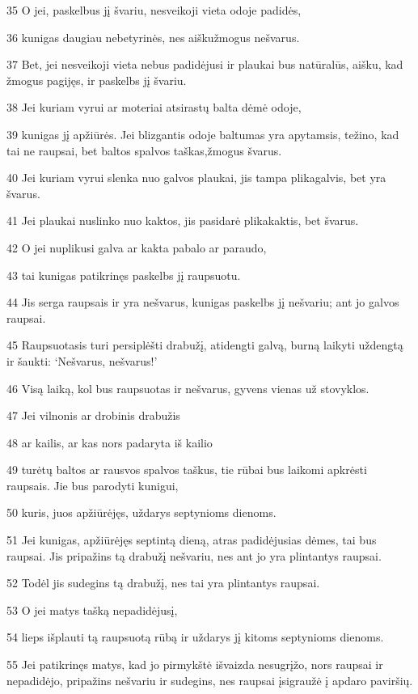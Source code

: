 \par 35 O jei, paskelbus jį švariu, nesveikoji vieta odoje padidės, 
\par 36 kunigas daugiau nebetyrinės, nes aišku­žmogus nešvarus. 
\par 37 Bet, jei nesveikoji vieta nebus padidėjusi ir plaukai bus natūralūs, aišku, kad žmogus pagijęs, ir paskelbs jį švariu. 
\par 38 Jei kuriam vyrui ar moteriai atsirastų balta dėmė odoje, 
\par 39 kunigas jį apžiūrės. Jei blizgantis odoje baltumas yra apytamsis, težino, kad tai ne raupsai, bet baltos spalvos taškas,­žmogus švarus. 
\par 40 Jei kuriam vyrui slenka nuo galvos plaukai, jis tampa plikagalvis, bet yra švarus. 
\par 41 Jei plaukai nuslinko nuo kaktos, jis pasidarė plikakaktis, bet švarus. 
\par 42 O jei nuplikusi galva ar kakta pabalo ar paraudo, 
\par 43 tai kunigas patikrinęs paskelbs jį raupsuotu. 
\par 44 Jis serga raupsais ir yra nešvarus, kunigas paskelbs jį nešvariu; ant jo galvos raupsai. 
\par 45 Raupsuotasis turi persiplėšti drabužį, atidengti galvą, burną laikyti uždengtą ir šaukti: ‘Nešvarus, nešvarus!’ 
\par 46 Visą laiką, kol bus raupsuotas ir nešvarus, gyvens vienas už stovyklos. 
\par 47 Jei vilnonis ar drobinis drabužis 
\par 48 ar kailis, ar kas nors padaryta iš kailio 
\par 49 turėtų baltos ar rausvos spalvos taškus, tie rūbai bus laikomi apkrėsti raupsais. Jie bus parodyti kunigui, 
\par 50 kuris, juos apžiūrėjęs, uždarys septynioms dienoms. 
\par 51 Jei kunigas, apžiūrėjęs septintą dieną, atras padidėjusias dėmes, tai bus raupsai. Jis pripažins tą drabužį nešvariu, nes ant jo yra plintantys raupsai. 
\par 52 Todėl jis sudegins tą drabužį, nes tai yra plintantys raupsai. 
\par 53 O jei matys tašką nepadidėjusį, 
\par 54 lieps išplauti tą raupsuotą rūbą ir uždarys jį kitoms septynioms dienoms. 
\par 55 Jei patikrinęs matys, kad jo pirmykštė išvaizda nesugrįžo, nors raupsai ir nepadidėjo, pripažins nešvariu ir sudegins, nes raupsai įsigraužė į apdaro paviršių. 
